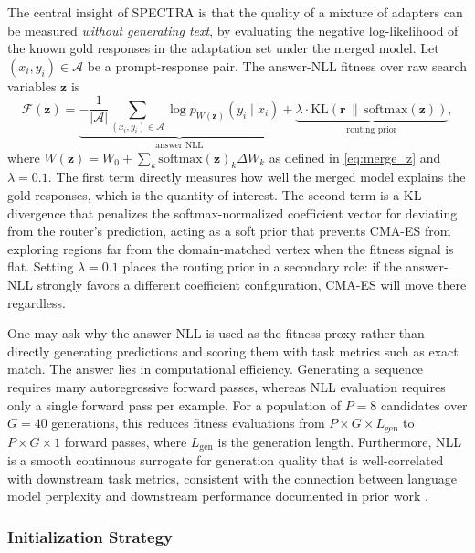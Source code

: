 \documentclass[preprint,12pt]{elsarticle}
\begin{document}
The central insight of SPECTRA is that the quality of a mixture of adapters
can be measured \emph{without generating text}, by evaluating the negative
log-likelihood of the known gold responses in the adaptation set under the
merged model. Let $(x_i, y_i) \in \mathcal{A}$ be a prompt-response pair.
The answer-NLL fitness over raw search variables $\mathbf{z}$ is
\begin{equation}
    \mathcal{F}(\mathbf{z}) =
    \underbrace{-\frac{1}{|\mathcal{A}|} \sum_{(x_i,y_i)\in\mathcal{A}}
    \log p_{W(\mathbf{z})}(y_i \mid x_i)}_{\text{answer NLL}}
    + \underbrace{\lambda \cdot \mathrm{KL}\!\left(\mathbf{r} \,\big\|\,
    \mathrm{softmax}(\mathbf{z})\right)}_{\text{routing prior}},
    \label{eq:fitness}
\end{equation}
where $W(\mathbf{z}) = W_0 + \sum_k \mathrm{softmax}(\mathbf{z})_k \Delta W_k$
as defined in \eqref{eq:merge_z} and $\lambda = 0.1$. The first term directly
measures how well the merged model explains the gold responses, which is the
quantity of interest. The second term is a KL divergence that penalizes the
softmax-normalized coefficient vector for deviating from the router's
prediction, acting as a soft prior that prevents CMA-ES from exploring regions
far from the domain-matched vertex when the fitness signal is flat. Setting
$\lambda = 0.1$ places the routing prior in a secondary role: if the answer-NLL
strongly favors a different coefficient configuration, CMA-ES will move there
regardless.

One may ask why the answer-NLL is used as the fitness proxy rather than
directly generating predictions and scoring them with task metrics such as
exact match. The answer lies in computational efficiency. Generating a sequence
requires many autoregressive forward passes, whereas NLL evaluation requires
only a single forward pass per example. For a population of $P = 8$ candidates
over $G = 40$ generations, this reduces fitness evaluations from $P \times G
\times L_{\text{gen}}$ to $P \times G \times 1$ forward passes, where
$L_{\text{gen}}$ is the generation length. Furthermore, NLL is a smooth
continuous surrogate for generation quality that is well-correlated with
downstream task metrics, consistent with the connection between language model
perplexity and downstream performance documented in prior work
\cite{brown2020gpt3}.

\subsubsection{Initialization Strategy}
\end{document}
